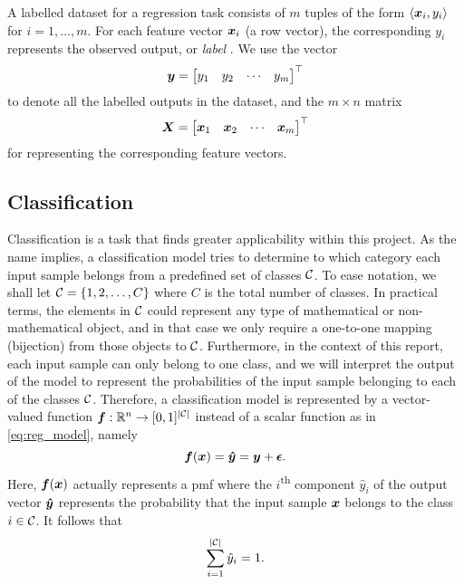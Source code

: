 \documentclass[../main.tex]{subfiles}
\begin{document}
A labelled dataset for a regression task consists of $m$ tuples of the form
$\langle {\bm{x}}_i, y_i\rangle$
for $i=1,\dots,m$.
For each feature vector ${\bm{x}}_i$ (a row vector), the corresponding $y_i$ represents the observed output, or \emph{label} \cite{burkov2019}.
We use the vector
\begin{equation}
    \label{eq:sup_learn_target}
    {\bm{y}} = \begin{bmatrix}
        y_1 & y_2 & \cdots & y_m
    \end{bmatrix}^\top
\end{equation}
to denote all the labelled outputs in the dataset, and the $m \times n$ matrix
\begin{equation}
    \label{eq:sup_learn_input_matrix}
    {\bm{X}} = \begin{bmatrix}
        {\bm{x}}_1 & {\bm{x}}_2 & \cdots & {\bm{x}}_m
    \end{bmatrix}^\top
\end{equation}
for representing the corresponding feature vectors.

\subsection{Classification}
\label{sec:background_classification}
Classification is a task that finds greater applicability within this project.
As the name implies, a classification model tries to determine to which category each input sample belongs from a predefined set of classes ${\mathcal{C}}$.
To ease notation, we shall let ${\mathcal{C}}=\{1, 2, \dots, C\}$ where $C$ is the total number of classes.
In practical terms, the elements in ${\mathcal{C}}$ could represent any type of mathematical or non-mathematical object, and in that case we only require a one-to-one mapping (bijection) from those objects to ${\mathcal{C}}$.
Furthermore, in the context of this report, each input sample can only belong to one class, and we will interpret the output of the model to represent the probabilities of the input sample belonging to each of the classes ${\mathcal{C}}$.
Therefore, a classification model is represented by a vector-valued function
${\bm{f}} : \mathbb{R}^n \rightarrow [0,1]^{\lvert{\mathcal{C}}\rvert}$
instead of a scalar function as in \cref{eq:reg_model}, namely
\begin{equation}
    \label{eq:cla_model}
    {\bm{f}}({\bm{x}}) = {\bm{\hat{y}}} = {\bm{y}} + \bm{\epsilon}.
\end{equation}
Here, ${\bm{f}}({\bm{x}})$ actually represents a \gls{pmf} where the $i$\textsuperscript{th} component $\hat{y}_i$ of the output vector ${\bm{\hat{y}}}$ represents the probability that the input sample ${\bm{x}}$ belongs to the class $i\in {\mathcal{C}}$.
It follows that
\begin{equation}
    \label{eq:pmf}
    \sum_{i=1}^{\lvert{\mathcal{C}}\rvert} \hat{y}_i = 1.
\end{equation}
\end{document}
